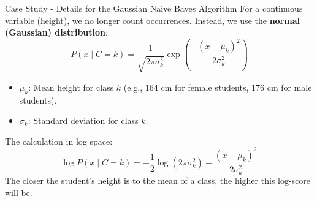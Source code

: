 \begin{frame}{Case Study - Details for the Gaussian Naive Bayes Algorithm}
	For a continuous variable (height), we no longer count occurrences. Instead, we use the \textbf{normal (Gaussian) distribution}:
	\begin{equation}
		P(x \mid C=k) = \frac{1}{\sqrt{2\pi\sigma_k^2}} \exp\left(-\frac{(x-\mu_k)^2}{2\sigma_k^2}\right)
		\nonumber
	\end{equation}
	\pause
	\begin{itemize}
		\item $\mu_k$: Mean height for class $k$ (e.g., 164 cm for female students, 176 cm for male students).
		\item $\sigma_k$: Standard deviation for class $k$.
	\end{itemize}
	\pause
	\vspace{0.3cm}
	The calculation in log space:
	\begin{equation}
		\log P(x \mid C=k) = -\frac{1}{2} \log(2\pi\sigma_k^2) - \frac{(x-\mu_k)^2}{2\sigma_k^2}
		\nonumber
	\end{equation}
	The closer the student's height is to the mean of a class, the higher this log-score will be.
\end{frame}